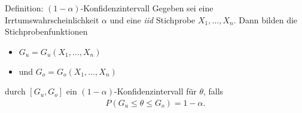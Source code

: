 \documentclass[t,11pt]{beamer}
\begin{document}
\begin{frame}
	\begin{block}{Definition: $(1-\alpha)$-Konfidenzintervall}
		Gegeben sei eine Irrtumswahrscheinlichkeit $\alpha$ und eine \textit{iid} Stichprobe $X_1,\dots,X_n$. Dann bilden die Stichprobenfunktionen
		\begin{itemize}
			\item $G_u = G_u(X_1,\dots,X_n)$
			\item und $G_o = G_o(X_1,\dots,X_n)$
		\end{itemize}
		durch $[G_u,G_o]$ ein $(1-\alpha)$-Konfidenzintervall für $\theta$, falls
		\begin{align*}
			P(G_u\leq \theta \leq G_o) = 1-\alpha.
		\end{align*}
	\end{block}
\end{frame}
\end{document}
